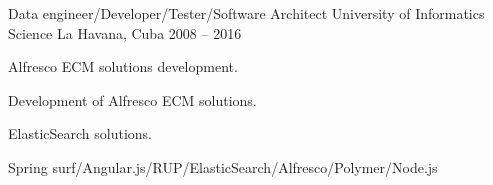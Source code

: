 \begin{cventries}
\cventry
{Data engineer/Developer/Tester/Software Architect } %
{University of Informatics Science} %
{La Havana, Cuba} %
{2008 – 2016} %
{ %
\begin{cvitems}
\item {Alfresco ECM solutions development.}
\item {Development of Alfresco ECM solutions.}
\item {ElasticSearch solutions.}
\item {Spring surf/Angular.js/RUP/ElasticSearch/Alfresco/Polymer/Node.js}
\end{cvitems}
}


\end{cventries}

